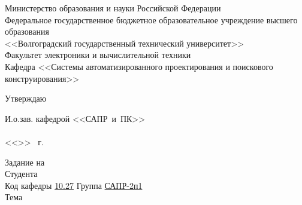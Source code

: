 \begin{titlepage}
    \begin{center}
        Министерство образования и науки Российской Федерации \\
        Федеральное государственное бюджетное образовательное учреждение высшего образования\\
        <<Волгоградский государственный технический университет>>\\
        Факультет электроники и вычислительной техники\\
        Кафедра <<Системы автоматизированного проектирования и поискового конструирования>>
    \end{center}
    \begin{flushright}
        \begin{center}
            \hspace*{9.7em}Утверждаю
        \end{center}
        И.о.зав. кафедрой <<САПР~и~ПК>>\\
        \hspace{0.5em}\\
        \vspace{0.5em}<<\underline{\hspace{2em}}>> \underline{\hspace{8.5em}} \the\year\ г.
        \vspace{1em}
    \end{flushright}
    Задание на 
        {}\\
    Студента \\
    Код кафедры \vspace{1em}\underline{\hspace{2em}10.27\hspace{5em}}\quad\qquad
    Группа \underline{\hspace{3em}САПР-2п1\hspace{5em}}\\
    Тема \vspace{0.5em}\underline{}
\end{titlepage}
